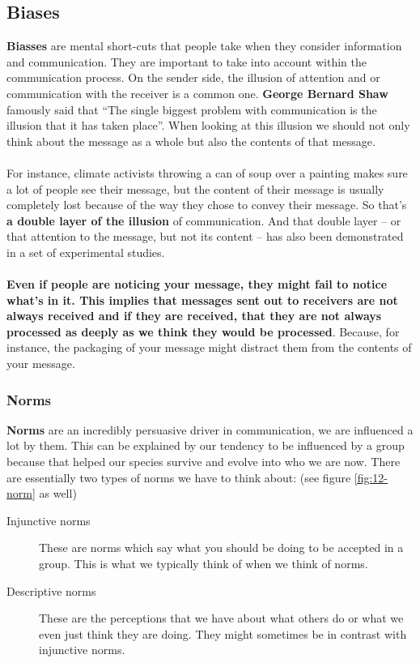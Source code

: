 \documentclass[../summary.tex]{subfiles}
\begin{document}
		\subsection{Biases}
			\textbf{Biasses} are mental short-cuts that people take when they consider information and communication. They are important to take into account within the communication process. On the sender side, the illusion of attention and or communication with the receiver is a common one. \textbf{George Bernard Shaw} famously said that ``The single biggest problem with communication is the illusion that it has taken place''. When looking at this illusion we should not only think about the message as a whole but also the contents of that message. \\
			\\
			For instance, climate activists throwing a can of soup over a painting makes sure a lot of people see their message, but the content of their message is usually completely lost because of the way they  chose to convey their message.  So that's \textbf{a double layer of the illusion} of communication. And that double layer -- or that attention to the message, but not its content -- has also been demonstrated in a set of experimental studies. \\
			\\
			\textbf{Even if people are noticing your message, they might fail to notice what's in it. This implies that messages sent out to receivers are not always received and if they are received, that they are not always processed as deeply as we think they would be processed}. Because, for instance, the packaging of your message might distract them from the contents of your message.
			
			\newpage
			
			\subsubsection{Norms}
				\textbf{Norms} are an incredibly persuasive driver in communication, we are influenced a lot by them. This can be explained by our tendency  to be influenced by a group because that helped our species survive and evolve into who we are now. There are essentially two types of norms we have to think about: (see figure \ref{fig:12-norm} as well)
				\begin{description}
					\item[Injunctive norms] These are norms which say what you should be doing to be accepted in a group. This is what we typically think of when we think of norms.
					\item[Descriptive norms] These are the perceptions that we have about what others do or what we even just think they are doing. They might sometimes be in contrast with injunctive norms. 
				\end{description}
				
\end{document}
